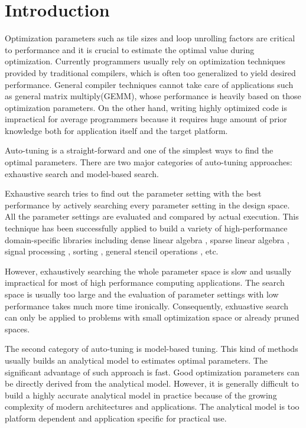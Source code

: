 \section{Introduction}
\label{sec:intro}


Optimization parameters such as tile sizes and loop unrolling factors are critical to performance and it
is crucial to estimate the optimal value during optimization.
Currently programmers usually rely on optimization techniques provided by traditional compilers, which
is often too generalized to yield desired performance.
General compiler techniques cannot take care of applications such as general matrix multiply(GEMM),
whose performance is heavily based on those optimization parameters.
On the other hand, writing highly optimized code is impractical for average
programmers because it requires huge amount of prior knowledge both for application
itself and the target platform.


\par

Auto-tuning is a straight-forward and one of the simplest ways to find the optimal parameters.
There are two major categories of auto-tuning approaches: exhaustive search and model-based search.
\par
Exhaustive search tries to find out the parameter setting with the best
performance by actively searching every parameter setting in
the design space. All the parameter settings are evaluated and compared by
actual execution.
This technique has been successfully applied to build a variety
of high-performance domain-specific libraries including
dense linear algebra \cite{whaley2001automated, bilmes2014optimizing},
sparse linear algebra \cite{vuduc2005oski}, signal processing
\cite{frigo2005design, puschel2005spiral}, sorting \cite{li2004dynamically},
general stencil operations \cite{kamil2010auto}, etc.

However, exhaustively searching the whole parameter space is slow and usually
impractical for most of high performance computing applications.
The search space is usually too large and the evaluation of parameter settings
with low performance takes much more time ironically.
Consequently, exhuastive search can only be applied to problems with small
optimization space or already pruned spaces.

The second category of auto-tuning is model-based tuning. This kind of methods
usually builds an analytical model to estimates optimal parameters.
The significant advantage of such approach is fast. Good optimization
parameters can be directly derived from the analytical model.
However, it is generally difficult to build a highly accurate analytical model
in practice because of the growing complexity of modern architectures and
applications. The analytical model is too platform dependent and application
specific for practical use.

